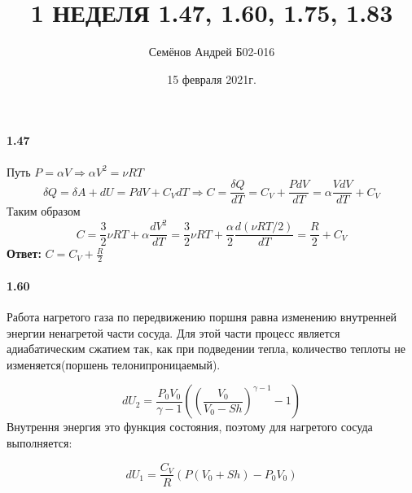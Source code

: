 \documentclass{article}
\title{1 НЕДЕЛЯ 1.47, 1.60, 1.75, 1.83}
\author{Семёнов Андрей Б02-016}
\date{15 февраля 2021г.}
\begin{document}
\maketitle

\paragraph{1.47}
\par Путь $P=\alpha V\Rightarrow\alpha V^2=\nu RT$
\begin{displaymath}
\delta Q=\delta A+dU=PdV + C_{V}dT\Rightarrow C=\frac{\delta Q}{dT}=C_{V}+\frac{PdV}{dT}=\alpha\frac{VdV}{dT}+C_{V}
\end{displaymath}
Таким образом
\begin{displaymath}
C=\frac32\nu RT + \alpha\frac{dV^2}{dT}=\frac32\nu RT + \frac\alpha2\frac{d(\nu RT/2)}{dT}=\frac R2 +C_{V}
\end{displaymath}
\textbf{Ответ:} $C=C_{V}+\frac R2$


\paragraph{1.60}
\par Работа нагретого газа по передвижению поршня равна изменению внутренней энергии ненагретой части сосуда. Для этой части процесс является адиабатическим сжатием так, как при подведении тепла, количество теплоты не изменяется(поршень телонипроницаемый).
\begin{figure}[h]
\begin{minipage}[h]{0.49\linewidth}
\end{minipage}
\end{figure}
\begin{displaymath}
dU_{2}=\frac{P_{0}V_{0}}{\gamma -1}((\frac{V_{0}}{V_{0}-Sh})^{\gamma -1}-1)
\end{displaymath}
Внутрення энергия это функция состояния, поэтому для нагретого сосуда выполняется:

\begin{displaymath}
dU_{1}=\frac{C_{V}}{R}(P(V_{0}+Sh)-P_{0}V_{0})
\end{displaymath}
\end{document}
